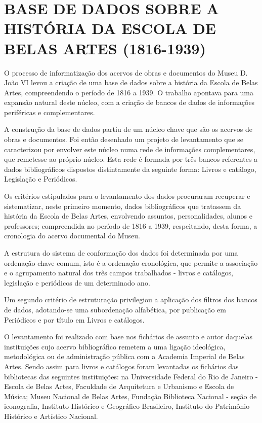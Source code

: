 \section{BASE DE DADOS SOBRE A HISTÓRIA DA ESCOLA DE BELAS ARTES (1816-1939)}

O processo de informatização dos acervos de obras e documentos do Museu D. João VI levou a criação de uma base de dados sobre a história da Escola de Belas Artes, compreendendo o período de 1816 a 1939. O trabalho apontava para uma expansão natural deste núcleo, com a criação de bancos de dados de informações periféricas e complementares.

A construção da base de dados partiu de um núcleo chave que são os acervos de obras e documentos. Foi então desenhado um projeto de levantamento que se caracterizou por envolver este núcleo numa rede de informações complementares, que remetesse ao próprio núcleo. Esta rede é formada por três bancos referentes a dados bibliográficos dispostos distintamente da seguinte forma: Livros e catálogo, Legislação e Periódicos.

Os critérios estipulados para o levantamento dos dados procuraram recuperar e sistematizar, neste primeiro momento, dados bibliográficos que tratassem da história da Escola de Belas Artes, envolvendo assuntos, personalidades, alunos e professores; compreendida no período de 1816 a 1939, respeitando, desta forma, a cronologia do acervo documental do Museu.

A estrutura do sistema de conformação dos dados foi determinada por uma ordenação chave comum, isto é a ordenação cronológica, que permite a associação e o agrupamento natural dos três campos trabalhados - livros e catálogos, legislação e periódicos de um determinado ano.

Um segundo critério de estruturação privilegiou a aplicação dos filtros dos bancos de dados, adotando-se uma subordenação alfabética, por publicação em Periódicos e por título em Livros e catálogos.

O levantamento foi realizado com base nos fichários de assunto e autor daquelas instituições cujo acervo bibliográfico remetem a uma ligação ideológica, metodológica ou de administração pública com a Academia Imperial de Belas Artes. Sendo assim para livros e catálogos foram levantadas os fichários das bibliotecas das seguintes instituições: na Universidade Federal do Rio de Janeiro - Escola de Belas Artes, Faculdade de Arquitetura e Urbanismo e Escola de Música; Museu Nacional de Belas Artes, Fundação Biblioteca Nacional - seção de iconografia, Instituto Histórico e Geográfico Brasileiro, Instituto do Patrimônio Histórico e Artístico Nacional.


